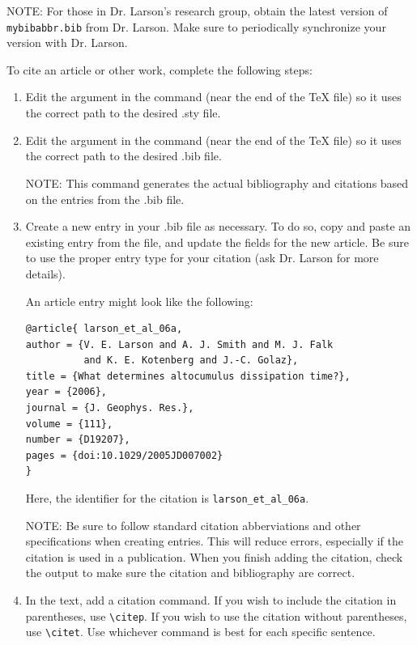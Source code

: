 \documentclass[master]{UWMThesis}
\begin{document}
NOTE: For those in Dr. Larson's research group, obtain the latest version of \verb=mybibabbr.bib= from Dr. Larson.  Make sure to periodically synchronize your version with Dr. Larson.

To cite an article or other work, complete the following steps:

\begin{enumerate}

\item  Edit the argument in the \verb== command (near the end of the TeX file) so it uses the correct path to the desired .sty file.  

\item Edit the argument in the \verb== command (near the end of the TeX file) so it uses the correct path to the desired .bib file.

NOTE: This command generates the actual bibliography and citations based on the entries from the .bib file.

\item Create a new entry in your .bib file as necessary.  To do so, copy and paste an existing entry from the file, and update the fields for the new article.  Be sure to use the proper entry type for your citation (ask Dr. Larson for more details).

An article entry might look like the following:
\begin{verbatim}
@article{ larson_et_al_06a,
author = {V. E. Larson and A. J. Smith and M. J. Falk
          and K. E. Kotenberg and J.-C. Golaz},
title = {What determines altocumulus dissipation time?},
year = {2006},
journal = {J. Geophys. Res.},
volume = {111},
number = {D19207},
pages = {doi:10.1029/2005JD007002}
}
\end{verbatim}

Here, the identifier for the citation is \verb=larson_et_al_06a=.

NOTE: Be sure to follow standard citation abberviations and other specifications when creating entries.  This will reduce errors, especially if the citation is used in a publication.  When you finish adding the citation, check the output to make sure the citation and bibliography are correct.

\item In the text, add a citation command.  If you wish to include the citation in parentheses, use \verb=\citep=.  If you wish to use the citation without parentheses, use \verb=\citet=.  Use whichever command is best for each specific sentence.


\end{enumerate}
\end{document}
